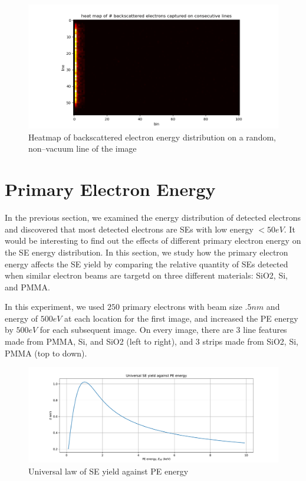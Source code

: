 \begin{figure}[h]
\begin{center}
\includegraphics[width=1.0\textwidth]{img/bse_heatmap.png}
\caption{\label{fig:bse_heatmap}Heatmap of backscattered electron energy distribution on a random, non--vacuum line of the image}
\end{center}
\end{figure}

\section{Primary Electron Energy}
In the previous section, we examined the energy distribution of detected electrons and discovered that most detected electrons are SEs with low energy $<50eV$. It would be interesting to find out the effects of different primary electron energy on the SE energy distribution. In this section, we study how the primary electron energy affects the SE yield by comparing the relative quantity of SEs detected when similar electron beams are targetd on three different materials: SiO2, Si, and PMMA.

In this experiment, we used $250$ primary electrons with beam size $.5nm$ and energy of $500eV$ at each location for the first image, and increased the PE energy by $500eV$ for each subsequent image. On every image, there are 3 line features made from PMMA, Si, and SiO2 (left to right), and 3 strips made from SiO2, Si, PMMA (top to down).

\begin{figure}[h]
\begin{center}
\includegraphics[width=1.0\textwidth]{img/law.pdf}
\caption{\label{fig:se_law}Universal law of SE yield against PE energy\cite{lin_newexam}}
\end{center}
\end{figure}


